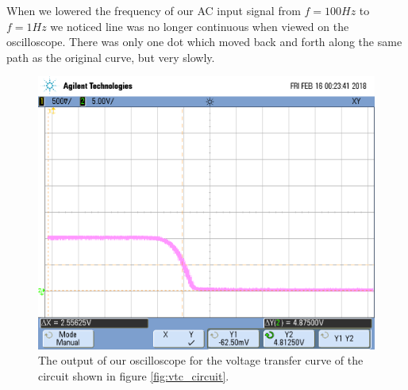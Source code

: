 When we lowered the frequency of our AC input signal from $f=100Hz$ to $f=1 Hz$ we noticed line was no longer continuous when viewed on the oscilloscope. There was only one dot which moved back and forth along the same path as the original curve, but very slowly.
\begin{figure}[h!]
	\centering
	\includegraphics[scale=0.75]{../img/scope_0}
	\caption{The output of our oscilloscope for the voltage transfer curve of the circuit shown in figure \ref{fig:vtc_circuit}.}
	\label{fig:vtc_result}
\end{figure}
\FloatBarrier

